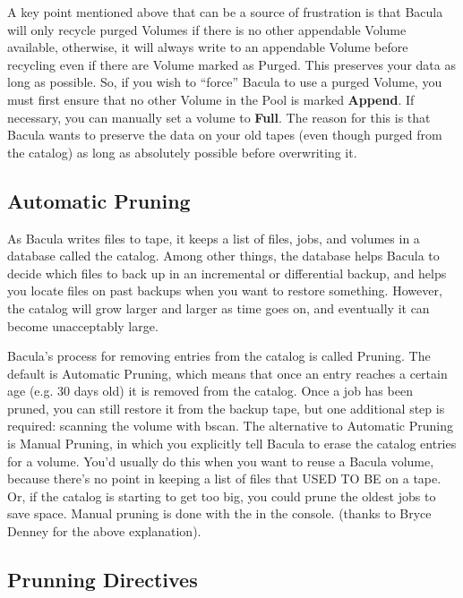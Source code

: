 A key point mentioned above that can be a source of frustration is that Bacula
will only recycle purged Volumes if there is no other appendable Volume
available, otherwise, it will always write to an appendable Volume before
recycling even if there are Volume marked as Purged. This preserves your data
as long as possible. So, if you wish to ``force'' Bacula to use a purged
Volume, you must first ensure that no other Volume in the Pool is marked {\bf
Append}. If necessary, you can manually set a volume to {\bf Full}. The reason
for this is that Bacula wants to preserve the data on your old tapes (even
though purged from the catalog) as long as absolutely possible before
overwriting it. 
\label{AutoPruning}

\subsection*{Automatic Pruning}

As Bacula writes files to tape, it keeps a list of files, jobs, and volumes in
a database called the catalog. Among other things, the database helps Bacula
to decide which files to back up in an incremental or differential backup, and
helps you locate files on past backups when you want to restore something.
However, the catalog will grow larger and larger as time goes on, and
eventually it can become unacceptably large. 

Bacula's process for removing entries from the catalog is called Pruning. The
default is Automatic Pruning, which means that once an entry reaches a certain
age (e.g. 30 days old) it is removed from the catalog. Once a job has been
pruned, you can still restore it from the backup tape, but one additional step
is required: scanning the volume with bscan. The alternative to Automatic
Pruning is Manual Pruning, in which you explicitly tell Bacula to erase the
catalog entries for a volume. You'd usually do this when you want to reuse a
Bacula volume, because there's no point in keeping a list of files that USED
TO BE on a tape. Or, if the catalog is starting to get too big, you could
prune the oldest jobs to save space. Manual pruning is done with the 
 in the console. (thanks to
Bryce Denney for the above explanation). 

\subsection*{Prunning Directives}


